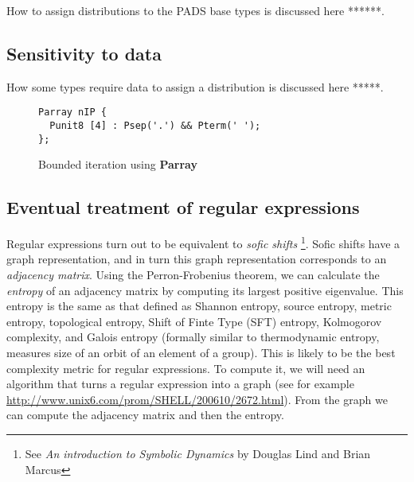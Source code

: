 How to assign distributions to the PADS base types is discussed here ******.

\subsection{Sensitivity to data}

How some types require data to assign a distribution is discussed here *****.

\begin{figure}
\label{fig:Parray1}
\begin{verbatim}
Parray nIP {
  Punit8 [4] : Psep('.') && Pterm(' ');
};
\end{verbatim}
\caption{Bounded iteration using \textbf{Parray}}
\end{figure}

\subsection{Eventual treatment of regular expressions}
\label{sec:RegularExpressions}

Regular expressions turn out to be equivalent to \textit{sofic shifts}
\footnote{See \textit{An introduction to Symbolic Dynamics} by
Douglas Lind and Brian Marcus}. Sofic shifts have a graph representation,
and in turn this graph representation corresponds to an
\textit{adjacency matrix}. Using the Perron-Frobenius theorem,
we can calculate the \textit{entropy} of an adjacency matrix by
computing its largest positive eigenvalue. This entropy is the same as
that defined as Shannon entropy, source entropy, metric entropy,
topological entropy, Shift of Finte Type (SFT) entropy, Kolmogorov
complexity, and Galois entropy (formally similar to thermodynamic
entropy, measures size of an orbit of an element of a group). This is
likely to be the best complexity metric for regular expressions.  To
compute it, we will need an algorithm that turns a regular expression
into a graph (see for example
\url{http://www.unix6.com/prom/SHELL/200610/2672.html}).
From the graph we can compute the adjacency matrix and then the
entropy.
